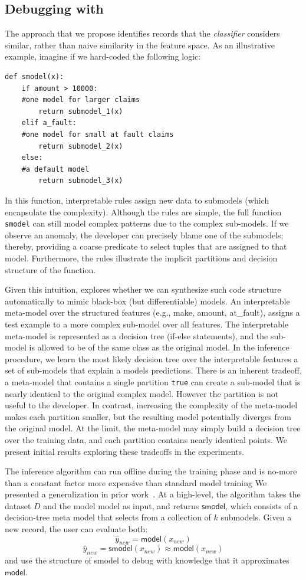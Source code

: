 \subsection{Debugging with \sys}
The approach that we propose identifies records that the {\it classifier} considers similar, rather than naive similarity in the feature space.
As an illustrative example, imagine if we hard-coded the following logic:
\begin{lstlisting}
def smodel(x):
    if amount > 10000:
    #one model for larger claims
        return submodel_1(x)
    elif a_fault:
    #one model for small at fault claims
        return submodel_2(x)
    else:
    #a default model
        return submodel_3(x)
\end{lstlisting}
In this function, interpretable rules assign new data to submodels (which encapsulate the complexity).
Although the rules are simple, the full function \texttt{smodel} can still model complex patterns due to the complex sub-models.
If we observe an anomaly, the developer can precisely blame one of the submodels; thereby, providing a coarse predicate to select tuples that are assigned to that model.
Furthermore, the rules illustrate the implicit partitions and decision structure of the function.

Given this intuition, \sys explores whether we can synthesize such code structure automatically to mimic black-box (but differentiable) models.
An interpretable meta-model over the structured features (e.g., make, amount, at\_fault), assigns a test example to a more complex sub-model over all features.
The interpretable meta-model is represented as a decision tree (if-else statements), and the sub-model is allowed to be of the same class as the original model.
In the inference procedure, we learn the most likely decision tree over the interpretable features a set of sub-models that explain a models predictions.
There is an inherent tradeoff, a meta-model that contains a single partition \texttt{true} can create a sub-model that is nearly identical to the original complex model. However the partition is not useful to the developer.  In contrast, increasing the complexity of the meta-model makes each partition smaller, but the resulting model potentially diverges from the original model.  At the limit, the meta-model may simply build a decision tree over the training data, and each partition contains nearly identical points.
We present initial results exploring these tradeoffs in the experiments.

The inference algorithm can run offline during the training phase and is no-more than a constant factor more expensive than standard model training
We presented a generalization in prior work~\cite{DBLP:journals/corr/KrishnanGLMPG16, krishnan17}. 
At a high-level, the algorithm takes the dataset $D$ and the model \textsf{model} as input, and returns $\textsf{smodel}$, which consists of a decision-tree meta model that selects from a collection of $k$ submodels. Given a new record, the user can evaluate both:
\[
\hat{y}_{new} = \textsf{model}(x_{new})
\]
\[
\hat{y}_{new} = \textsf{smodel}(x_{new}) \approx \textsf{model}(x_{new})
\]
and use the structure of \textsf{smodel} to debug with knowledge that it approximates $\textsf{model}$.

